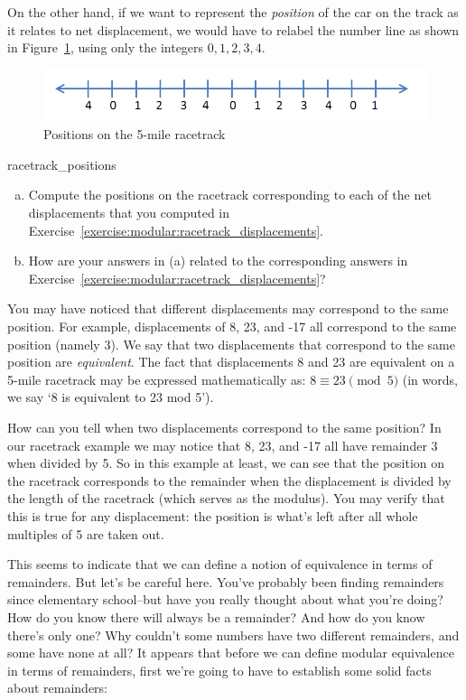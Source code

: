 On the other hand, if we want to represent the \emph{position} of the car on the track as it relates to net displacement, we would have to relabel the number line as shown in  Figure~\ref{fig:positions}, using only the integers $0,1,2,3,4$.   
\begin{figure}[h]
\begin{center}
\includegraphics[width=4.5in]{images/integers_mod_5.png}
\end{center}
\caption{\label{fig:positions}Positions on the 5-mile racetrack}
\end{figure}

\begin{exercise}{racetrack_positions}
\begin{enumerate}[(a)]
\item
Compute the positions on the racetrack corresponding to each of the net displacements that you computed in Exercise~\ref{exercise:modular:racetrack_displacements}.
\item
How are your answers in (a) related to the corresponding answers in Exercise~\ref{exercise:modular:racetrack_displacements}?
\end{enumerate}
\end{exercise}

You may have noticed that different displacements may correspond to the same position. For example, displacements of 8, 23, and -17 all correspond to the same position (namely 3). We say that two displacements that correspond to the same position are \emph{equivalent}. The fact that displacements 8 and 23 are equivalent on a 5-mile racetrack may be expressed mathematically as: $8 \equiv 23 \pmod{5}$ (in words, we say `8 is equivalent to 23 mod 5').

How can you tell when two displacements correspond to the same position?  
In our racetrack example we may notice that 8, 23, and -17 all  have remainder 3 when divided by 5. 
So in this example at least, we can see that the position  on the racetrack corresponds to the remainder when the displacement is divided by the length of the racetrack (which serves as the modulus).
You may verify that this is true for any displacement: the position is what's left after all whole multiples of 5 are taken out.

This seems to indicate that we can define a notion of equivalence in terms of remainders. But let's be careful here. You've probably been finding remainders since elementary school--but have you really thought about what you're doing?
How do you know there will always be a remainder? And how do you know there's only one?  Why couldn't some numbers have two different remainders, and some have none at all? It appears that before we can define modular equivalence in terms of remainders, 
first we're going to have to establish some solid facts about remainders:


